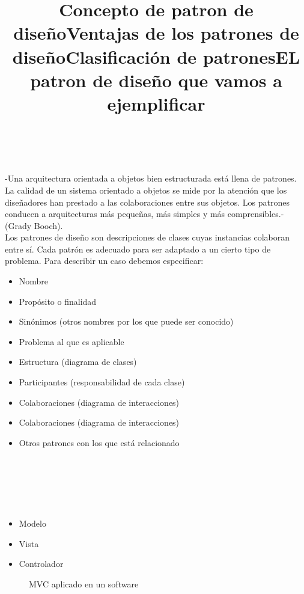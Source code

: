 \documentclass[a4paper,11pt]{report}
\begin{document}
\title{\textbf{Concepto de patron de diseño}}\\
\\-Una arquitectura orientada a objetos bien estructurada está llena de patrones. La calidad de un sistema orientado a objetos se mide por la atención que los diseñadores han prestado a las colaboraciones entre sus objetos. Los patrones conducen a arquitecturas más pequeñas, más simples y más comprensibles.- (Grady Booch).\\
Los patrones de diseño son descripciones de clases cuyas instancias colaboran entre sí. Cada patrón es adecuado para ser adaptado a un cierto tipo de problema. Para describir un caso debemos especificar:
\begin{itemize}
    \item{Nombre}
    \item{Propósito o finalidad }
    \item{Sinónimos (otros nombres por los que puede ser conocido) }
    \item{Problema al que es aplicable }
    \item{Estructura (diagrama de clases) }
    \item{Participantes (responsabilidad de cada clase) }
    \item{Colaboraciones (diagrama de interacciones) }
    \item{Colaboraciones (diagrama de interacciones) }
    \item{Otros patrones con los que está relacionado }
\end{itemize}


\title{\textbf{Ventajas de los patrones de diseño}}\\



\title{\textbf{Clasificación de patrones}}\\



\title{\textbf{EL patron de diseño que vamos a ejemplificar}}\\






\begin{itemize}
    \item{Modelo}
    \item{Vista}
    \item{Controlador}
\end{itemize}

\begin{figure}[!ht]
\begin{center}

\caption{MVC aplicado en un software}
\end{center}
\end{figure}
\end{document}

